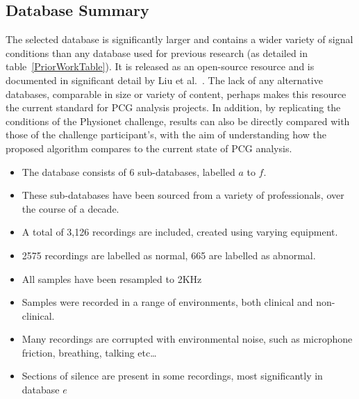 \documentclass[titlepage, 12pt]{scrartcl} \usepackage{enumitem}
\begin{document}
\subsection{Database Summary}
The selected database is significantly larger and contains a wider variety of
signal conditions than any database used for previous research (as detailed in
table~\ref{PriorWorkTable}). It is released as an open-source resource and is
documented in significant detail by Liu et al.~\parencite{Liu2016}. The lack
of any alternative databases, comparable in size or variety of content, perhaps
makes this resource the current standard for PCG analysis projects. In
addition, by replicating the conditions of the Physionet challenge, results can
also be directly compared with those of the challenge participant's, with the
aim of understanding how the proposed algorithm compares to the current state
of PCG analysis.

\begin{itemize}
    \item The database consists of 6 sub-databases, labelled $a$ to $f$.
    \item These sub-databases have been sourced from a variety of professionals,
        over the course of a decade.
    \item A total of 3,126 recordings are included, created using varying equipment.
    \item 2575 recordings are labelled as normal, 665 are labelled as abnormal.
    \item All samples have been resampled to 2KHz
    \item Samples were recorded in a range of environments, both clinical and
        non-clinical.
    \item Many recordings are corrupted with environmental noise, such as
        microphone friction, breathing, talking etc\ldots
    \item Sections of silence are present in some recordings, most
        significantly in database $e$
\end{itemize}
\end{document}
